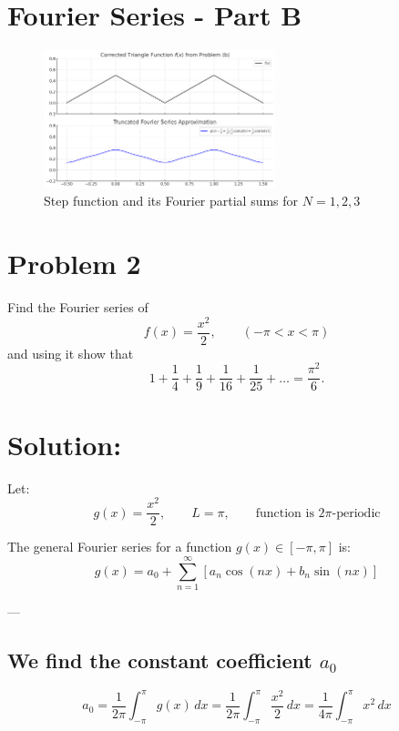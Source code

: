 \documentclass{article}
\begin{document}
\section*{Fourier Series - Part B}

\begin{figure}[h!]
    \centering
    \includegraphics[width=0.6\textwidth]{Figure_2.png}
    \caption{Step function and its Fourier partial sums for $N=1,2,3$}
\end{figure}




\newpage
\section*{Problem 2}

\noindent
Find the Fourier series of
\[
f(x) = \frac{x^2}{2}, \qquad (-\pi < x < \pi)
\]
and using it show that
\[
1 + \frac{1}{4} + \frac{1}{9} + \frac{1}{16} + \frac{1}{25} + \dots = \frac{\pi^2}{6}.
\]

\section*{Solution:}
Let:
\[
g(x) = \frac{x^2}{2}, \qquad L = \pi, \qquad \text{function is } 2\pi\text{-periodic}
\]

The general Fourier series for a function \( g(x) \in [-\pi, \pi] \) is:
\[
g(x) = a_0 + \sum_{n=1}^{\infty} \left[ a_n \cos(nx) + b_n \sin(nx) \right]
\]

---

\subsection*{We find the constant coefficient \( a_0 \)}

\[
a_0 = \frac{1}{2\pi} \int_{-\pi}^{\pi} g(x) \, dx = \frac{1}{2\pi} \int_{-\pi}^{\pi} \frac{x^2}{2} \, dx = \frac{1}{4\pi} \int_{-\pi}^{\pi} x^2 \, dx
\]
\end{document}

